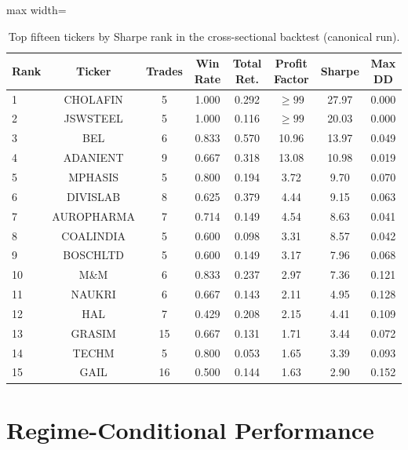 \begin{table}[H]
\centering
\caption{Top fifteen tickers by Sharpe rank in the cross-sectional backtest (canonical run).}
\label{tab:top_backtest}
\renewcommand{\arraystretch}{1.3}
\begin{adjustbox}{max width=\textwidth}
\begin{tabular}{l c c c c c c c}
\toprule
\textbf{Rank} & \textbf{Ticker} & \textbf{Trades} & \textbf{Win Rate} & \textbf{Total Ret.} & \textbf{Profit Factor} & \textbf{Sharpe} & \textbf{Max DD} \\
\midrule
1  & CHOLAFIN   &  5 & 1.000 & 0.292 & $\geq 99$ & 27.97 & 0.000 \\
2  & JSWSTEEL   &  5 & 1.000 & 0.116 & $\geq 99$ & 20.03 & 0.000 \\
3  & BEL        &  6 & 0.833 & 0.570 & 10.96     & 13.97 & 0.049 \\
4  & ADANIENT   &  9 & 0.667 & 0.318 & 13.08     & 10.98 & 0.019 \\
5  & MPHASIS    &  5 & 0.800 & 0.194 &  3.72     &  9.70 & 0.070 \\
6  & DIVISLAB   &  8 & 0.625 & 0.379 &  4.44     &  9.15 & 0.063 \\
7  & AUROPHARMA &  7 & 0.714 & 0.149 &  4.54     &  8.63 & 0.041 \\
8  & COALINDIA  &  5 & 0.600 & 0.098 &  3.31     &  8.57 & 0.042 \\
9  & BOSCHLTD   &  5 & 0.600 & 0.149 &  3.17     &  7.96 & 0.068 \\
10 & M\&M       &  6 & 0.833 & 0.237 &  2.97     &  7.36 & 0.121 \\
11 & NAUKRI     &  6 & 0.667 & 0.143 &  2.11     &  4.95 & 0.128 \\
12 & HAL        &  7 & 0.429 & 0.208 &  2.15     &  4.41 & 0.109 \\
13 & GRASIM     & 15 & 0.667 & 0.131 &  1.71     &  3.44 & 0.072 \\
14 & TECHM      &  5 & 0.800 & 0.053 &  1.65     &  3.39 & 0.093 \\
15 & GAIL       & 16 & 0.500 & 0.144 &  1.63     &  2.90 & 0.152 \\
\bottomrule
\end{tabular}
\end{adjustbox}
\end{table}

\section{Regime-Conditional Performance}

